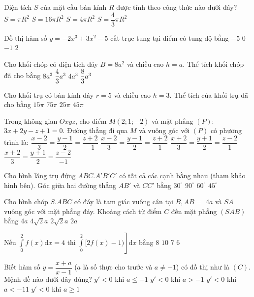 \begin{ex}%
Diện tích $S$ của mặt cầu bán kính $R$ được tính theo công thức nào dưới đây?
\choice
{$S=\pi R^2$}
{$S=16\pi R^2$}
{\True $S=4\pi R^2$}
{$S=\dfrac{4}{3} \pi R^2$}

\end{ex}
\begin{ex}%
Đồ thị hàm số $y=-2 x^3+3 x^2-5$ cắt trục tung tại điểm có tung độ bằng
\choice
{\True $-5$}
{$0$}
{$-1$}
{$2$}

\end{ex}
\begin{ex}%
Cho khối chóp có diện tích đáy $B=8 a^2$ và chiều cao $h=a$. Thể tích khối chóp đã cho bằng
\choice
{$8 a^3$}
{$\dfrac{4}{3} a^3$}
{$4 a^3$}
{\True $\dfrac{8}{3} a^3$}

\end{ex}
\begin{ex}%
Cho khối trụ có bán kính đáy $r=5$ và chiều cao $h=3$. Thể tích của khối trụ đã cho bằng
\choice
{$15\pi$}
{\True $75\pi$}
{$25\pi$}
{$45\pi$}

\end{ex}
\begin{ex}%
Trong không gian $O x y z$, cho điểm $M(2; 1;-2)$ và mặt phẳng $(P)$: $3 x+2 y-z+1=0$. Đường thẳng đi qua $M$ và vuông góc với $(P)$ có phương trình là:
\choice
{\True $\dfrac{x-2}{3}=\dfrac{y-1}{2}=\dfrac{z+2}{-1}$}
{$\dfrac{x-2}{3}=\dfrac{y-1}{2}=\dfrac{z+2}{1}$}
{$\dfrac{x+2}{3}=\dfrac{y+1}{2}=\dfrac{z-2}{1}$}
{$\dfrac{x+2}{3}=\dfrac{y+1}{2}=\dfrac{z-2}{-1}$}

\end{ex}
\begin{ex}%
Cho hình lăng trụ đứng $ABC.A'B'C'$ có tất cả các cạnh bằng nhau (tham khảo hình bên). Góc giữa hai đường thẳng $AB'$ và $CC'$ bằng
\choice
{$30^{\circ}$}
{$90^{\circ}$}
{$60^{\circ}$}
{\True $45^{\circ}$}

\end{ex}
\begin{ex}%
Cho hình chóp $S.ABC$ có đáy là tam giác vuông cân tại $B, AB=$ $4 a$ và $SA$ vuông góc với mặt phẳng đáy. Khoảng cách từ điểm $C$ đến mặt phẳng $(SAB)$ bằng
\choice
{\True $4 a$}
{$4\sqrt{2} a$}
{$2\sqrt{2} a$}
{$2 a$}

\end{ex}
\begin{ex}%
Nếu $\displaystyle\int\limits_0^2 f(x) \mathrm{d} x=4$ thì $\left.\displaystyle\int\limits_0^2[2 f(x)-1)\right] \mathrm{d} x$ bằng
\choice
{$8$}
{$10$}
{$7$}
{\True $6$}

\end{ex}
\begin{ex}%
Biết hàm số $y=\dfrac{x+a}{x-1}$ ($a$ là số thực cho trước và $a \neq-1$) có đồ thị như là $(C)$. Mệnh đề nào dưới đây đúng?
\choice
{$y'<0$ khi $a \leq-1$}
{\True $y'<0$ khi $a>-1$}
{$y'<0$ khi $a<-11$}
{$y'<0$ khi $a \geq 1$}

\end{ex}

